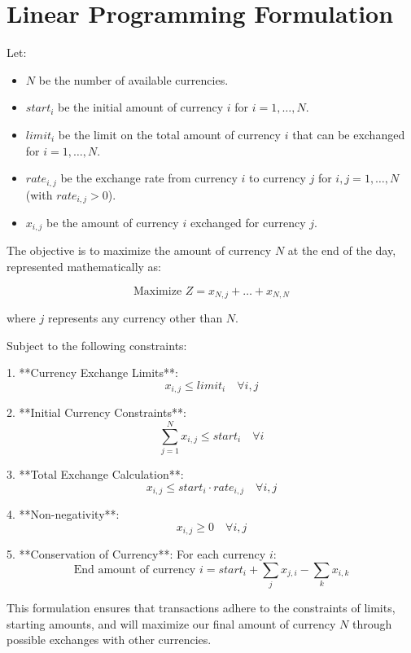 \documentclass{article}
\begin{document}
\section*{Linear Programming Formulation}

Let:
\begin{itemize}
    \item \( N \) be the number of available currencies.
    \item \( start_i \) be the initial amount of currency \( i \) for \( i = 1, \ldots, N \).
    \item \( limit_i \) be the limit on the total amount of currency \( i \) that can be exchanged for \( i = 1, \ldots, N \).
    \item \( rate_{i,j} \) be the exchange rate from currency \( i \) to currency \( j \) for \( i, j = 1, \ldots, N \) (with \( rate_{i,j} > 0 \)).
    \item \( x_{i,j} \) be the amount of currency \( i \) exchanged for currency \( j \).
\end{itemize}

The objective is to maximize the amount of currency \( N \) at the end of the day, represented mathematically as:

\[
\text{Maximize } Z = x_{N,j} + \ldots + x_{N,N}
\]

where \( j \) represents any currency other than \( N \).

Subject to the following constraints:

1. **Currency Exchange Limits**:
   \[
   x_{i,j} \leq limit_i \quad \forall i, j
   \]

2. **Initial Currency Constraints**:
   \[
   \sum_{j=1}^{N} x_{i,j} \leq start_i \quad \forall i
   \]

3. **Total Exchange Calculation**:
   \[
   x_{i,j} \leq start_i \cdot rate_{i,j} \quad \forall i,j
   \]

4. **Non-negativity**:
   \[
   x_{i,j} \geq 0 \quad \forall i,j
   \]

5. **Conservation of Currency**: For each currency \( i \):
   \[
   \text{End amount of currency } i = start_i + \sum_{j} x_{j,i} - \sum_{k} x_{i,k}
   \]

This formulation ensures that transactions adhere to the constraints of limits, starting amounts, and will maximize our final amount of currency \( N \) through possible exchanges with other currencies.
\end{document}
